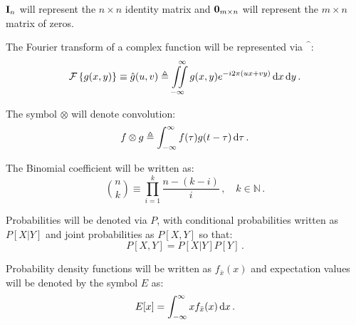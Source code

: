 \noindent $\mathbf I_{n}$ will represent the $n \times n$ identity matrix and $\mathbf 0_{m \times n}$ will represent the $m \times n$ matrix of zeros.

\noindent The Fourier transform of a complex function will be represented via $\hat{\phantom{f}}$:
\begin{equation*}
\mathcal F\left\{g(x,y)\right\} \equiv \hat{g}(u,v) \triangleq \iint\limits_{-\infty}^{\quad \infty} g(x,y) e^{-i2\pi\left(ux +vy\right)} \,\mathrm{d}x\,\mathrm{d}y \,.
\end{equation*}

\noindent The symbol $\otimes$ will denote convolution:
\begin{equation*}
 f \otimes g \triangleq \int_{-\infty}^{\infty} f(\tau)g(t-\tau) \,\mathrm{d}\tau \,.
\end{equation*}

\noindent The Binomial coefficient will be written as:
\begin{equation*}
\binom{n}{k} \equiv \prod_{i=1}^k \frac{n-(k-i)}{i} \,,\quad k \in \mathbb N \,.
\end{equation*}

\noindent Probabilities will be denoted via $P$, with conditional probabilities written as $P[X|Y]$ and joint probabilities as $P[X,Y]$ so that:
\begin{equation*}
P[X,Y] = P[X|Y]P[Y] \,.
\end{equation*}

\noindent Probability density functions will be written as $f_{\bar x} (x)$ and expectation values will be denoted by the symbol $E$ as:
\begin{equation*}
E[x] = \int_{-\infty}^\infty x f_{\bar x}(x) \,\mathrm{d}x \,.
\end{equation*}



